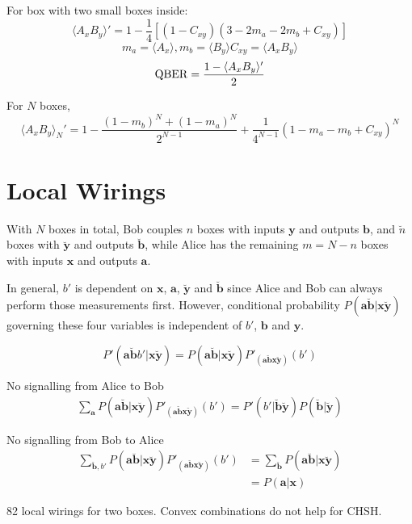 \documentclass[10pt, a4paper]{article}
\newcommand{\?}{\mathrel{?}} %
\newcommand{\cvec}[1]{\boldsymbol{\mathbf{#1}}}    %
\numberwithin{equation}{section} %
\theoremstyle{definition}
\theoremstyle{plain}
\theoremstyle{plain}
\begin{document}
  For box with two small boxes inside:
  \[ \langle A_x B_y \rangle' = 1 - \frac{1}{4} \left[ (1 - C_{xy}) (3 - 2m_a - 2 m_b + C_{xy} ) \right] \]
      \[ m_a = \langle A_x \rangle, m_b = \langle B_y \rangle C_{xy} = \langle A_x B_y \rangle \]
      \[ {\rm QBER} = \frac{1 - \langle A_x B_y \rangle'}{2} \]

      For \(N\) boxes,
    \[ \langle A_x B_y \rangle_{N}' = 1 - \frac{{(1-m_b)}^N + {(1-m_a)}^N}{2^{N-1}} + \frac{1}{4^{N-1}} {(1-m_a-m_b+C_{xy})}^{N} \]

    \section{Local Wirings}

    With \(N\) boxes in total, Bob couples \(n\) boxes with inputs \(\cvec{y}\) and outputs \(\cvec{b}\), and \(\breve{n}\) boxes with \(\breve{\cvec{y}}\) and outputs \(\breve{\cvec{b}}\), while Alice has the remaining \(m = N - n\) boxes with inputs \(\cvec{x}\) and outputs \(\cvec{a}\).

    In general, \(b'\) is dependent on \(\cvec{x}\), \(\cvec{a}\), \(\breve{\cvec{y}}\) and \(\breve{\cvec{b}}\) since Alice and Bob can always perform those measurements first. However, conditional probability \(P(\cvec{a}\breve{\cvec{b}}|\cvec{x}\breve{\cvec{y}})\) governing these four variables is independent of \(b'\), \(\cvec{b}\) and \(\cvec{y}\).

    \[ P'(\cvec{a}\breve{\cvec{b}}b'|\cvec{x}\breve{\cvec{y}}) = P(\cvec{a}\breve{\cvec{b}}|\cvec{x}\breve{\cvec{y}}) P'_{(\cvec{a}\breve{\cvec{b}}\cvec{x}\breve{\cvec{y}})}(b')  \]

    No signalling from Alice to Bob
    \begin{align}
      \sum_{\cvec{a}} P(\cvec{a}\breve{\cvec{b}}|\cvec{x}\breve{\cvec{y}}) P'_{(\cvec{a}\breve{\cvec{b}}\cvec{x}\breve{\cvec{y}})}(b') = P'(b'|\breve{\cvec{b}}\breve{\cvec{y}}) P(\breve{\cvec{b}}|\breve{\cvec{y}})
    \end{align}

    No signalling from Bob to Alice
    \begin{align}
      \sum_{\cvec{\breve{b}}, b'} P(\cvec{a}\breve{\cvec{b}}|\cvec{x}\breve{\cvec{y}}) P'_{(\cvec{a}\breve{\cvec{b}}\cvec{x}\breve{\cvec{y}})}(b') &= \sum_{\cvec{\breve{b}}} P(\cvec{a}\breve{\cvec{b}}|\cvec{x}\breve{\cvec{y}}) \\
                                                                                                                                                     &= P(\cvec{a}|\cvec{x})
    \end{align}

    82 local wirings for two boxes. Convex combinations do not help for CHSH\@.

  
\end{document}
